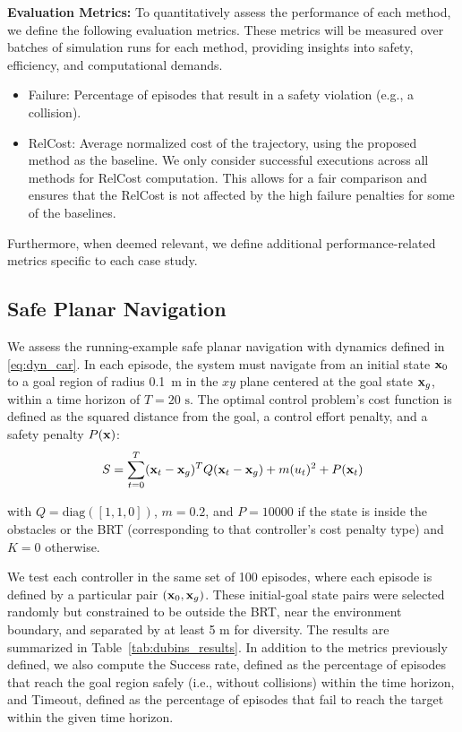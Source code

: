 \noindent \textbf{Evaluation Metrics:} To quantitatively assess the performance of each method, we define the following evaluation metrics. These metrics will be measured over batches of simulation runs for each method, providing insights into safety, efficiency, and computational demands.

\begin{itemize}
    \item Failure: Percentage of episodes that result in a safety violation (e.g., a collision).
    \item RelCost: Average normalized cost of the trajectory, using the proposed method as the baseline. We only consider successful executions across all methods for RelCost computation. This allows for a fair comparison and ensures that the RelCost is not affected by the high failure penalties for some of the baselines.
\end{itemize}

Furthermore, when deemed relevant, we define additional performance-related metrics specific to each case study.

\subsection{\label{case_dub3D}Safe Planar Navigation}

We assess the running-example safe planar navigation with dynamics defined in \eqref{eq:dyn_car}. In each episode, the system must navigate from an initial state $\mathbf{x}_0$ to a goal region of radius 0.1~m in the $xy$ plane centered at the goal state $\mathbf{x}_g$, within a time horizon of $T = 20\text{ s}$. The optimal control problem's cost function is defined as the squared distance from the goal, a control effort penalty, and a safety penalty $P(\mathbf{x})$:
\begin{equation}\fontsize{9.5}{10}\selectfont
S=\sum_{t=0}^{T} (\state_t - \state_g)^T Q(\state_t - \state_g) + m(u_t)^2 + P(\state_t) \\
\end{equation}

\noindent with $Q = \text{diag}([1, 1, 0])$, $m = 0.2$, and $P=10000$ if the state is inside the obstacles or the BRT (corresponding to that controller's cost penalty type) and $K=0$ otherwise.

We test each controller in the same set of 100 episodes, where each episode is defined by a particular pair $(\mathbf{x}_0, \mathbf{x}_g)$. These initial-goal state pairs were selected randomly but constrained to be outside the BRT, near the environment boundary, and separated by at least 5 m for diversity.
The results are summarized in Table~\ref{tab:dubins_results}. In addition to the metrics previously defined, we also compute the Success rate, defined as the percentage of episodes that reach the goal region safely (i.e., without collisions) within the time horizon, and Timeout, defined as the percentage of episodes that fail to reach the target within the given time horizon. 

